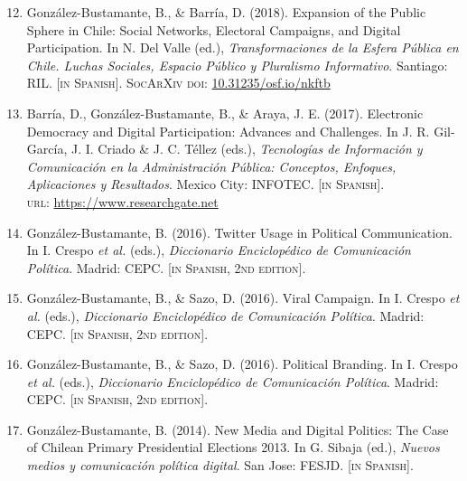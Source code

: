 \documentclass[letterpaper,margin]{res}
\newenvironment{benumerate}[1]{
    \let\oldItem\item
    \def\item{\addtocounter{enumi}{-2}\oldItem}
    \begin{enumerate}
    \setcounter{enumi}{#1}
    \addtocounter{enumi}{1}
}{
    \end{enumerate}
}
\begin{document}
\begin{resume}
\begin{benumerate}{11}
\item{\small Gonz\'alez-Bustamante, B., \& Barr\'ia, D. (2018). Expansion of the Public Sphere in Chile: Social Networks, Electoral Campaigns, and Digital Participation. In N. Del Valle (ed.), {\itshape Transformaciones de la Esfera P\'ublica en Chile. Luchas Sociales, Espacio P\'ublico y Pluralismo Informativo}. Santiago: RIL. {\footnotesize \scshape [in Spanish]}. {\scshape {\footnotesize SocArXiv} doi}: \href{https://doi.org/10.31235/osf.io/nkftb}{10.31235/osf.io/nkftb}}\vspace{1,1mm}

\item{\small Barr\'ia, D., Gonz\'alez-Bustamante, B., \& Araya, J. E. (2017). Electronic Democracy and Digital Participation: Advances and Challenges. In J. R. Gil-Garc\'ia, J. I. Criado \&  J. C. T\'ellez (eds.), {\itshape Tecnolog\'ias de Informaci\'on y Comunicaci\'on en la Administraci\'on P\'ublica: Conceptos, Enfoques, Aplicaciones y Resultados}. Mexico City: INFOTEC. {\footnotesize \scshape [in Spanish]}. \\ {\scshape url}: \href{https://www.researchgate.net/publication/321980289_Democracia_electronica_y_participacion_digital_Avances_y_desafios}{https://www.researchgate.net}}\vspace{1mm}

\item{\small Gonz\'alez-Bustamante, B. (2016). Twitter Usage in Political Communication. In I. Crespo {\itshape et al.} (eds.), {\itshape Diccionario Enciclop\'edico de Comunicaci\'on Pol\'itica}. Madrid: CEPC. {\footnotesize \scshape [in Spanish, 2nd edition]}.}\vspace{1mm}

\item{\small Gonz\'alez-Bustamante, B., \& Sazo, D. (2016). Viral Campaign. In I. Crespo {\itshape et al.} (eds.), {\itshape Diccionario Enciclop\'edico de Comunicaci\'on Pol\'itica}. Madrid: CEPC. {\footnotesize \scshape [in Spanish, 2nd edition]}.}\vspace{1mm}

\item{\small Gonz\'alez-Bustamante, B., \& Sazo, D. (2016). Political Branding. In I. Crespo {\itshape et al.} (eds.), {\itshape Diccionario Enciclop\'edico de Comunicaci\'on Pol\'itica}. Madrid: CEPC. {\footnotesize \scshape [in Spanish, 2nd edition]}.}\vspace{1mm}

\item{\small Gonz\'alez-Bustamante, B. (2014). New Media and Digital Politics: The Case of Chilean Primary Presidential Elections 2013. In G. Sibaja (ed.), {\itshape Nuevos medios y comunicaci\'on pol\'itica digital}. San Jose: FESJD. {\footnotesize \scshape [in Spanish]}.}\vspace{1mm}


\end{benumerate}
\end{resume}
\end{document}
